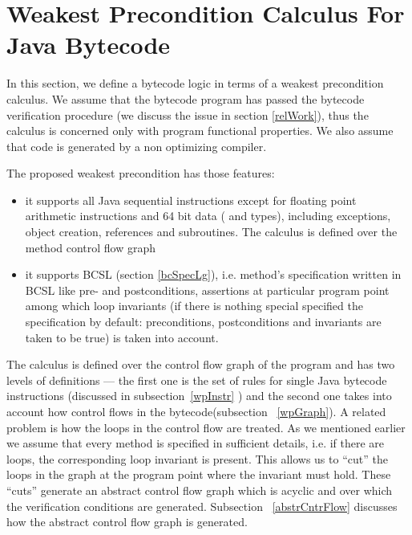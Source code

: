 
\section{Weakest Precondition Calculus For Java Bytecode}\label{wpbc}
In this section, we define a bytecode logic in terms of a weakest precondition calculus.
We assume that the bytecode program has passed the bytecode verification procedure (we discuss the issue in section \ref{relWork}),
 thus the calculus is concerned only with program functional properties. We also assume that code is generated by a non optimizing compiler. 

The proposed weakest precondition has those features:
\begin{itemize}
\item it supports all Java sequential instructions except for floating point arithmetic instructions and 64 bit data ( and  types), including 
exceptions, object creation, references and subroutines. The calculus is defined over the method control flow graph

\item it supports BCSL (section \ref{bcSpecLg}), i.e. method's specification written in BCSL like pre- and postconditions, assertions at particular program point among 
which loop invariants (if there is nothing special specified the specification by default: preconditions, postconditions and invariants are taken to be true) is taken into account. %
\end{itemize}

The calculus is defined over the control flow graph of the program and has two levels of definitions --- the first one is the set of rules for single Java bytecode instructions (discussed in subsection~\ref{wpInstr} ) and the second one takes into account how control
 flows in the bytecode(subsection ~\ref{wpGraph}). A related problem is how the loops in the control flow are treated. 
As we mentioned earlier we assume that every method is specified in sufficient details, i.e. if there are loops, the corresponding 
loop invariant is present. This allows us to ``cut'' the loops in the graph at the program point where the invariant must hold. 
These ``cuts'' generate an abstract control flow graph which is acyclic and over which the verification conditions are generated. Subsection ~\ref{abstrCntrFlow} discusses 
how the abstract control flow graph is generated.

